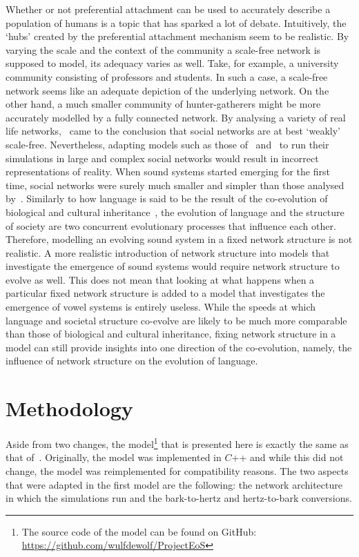 \documentclass[11pt]{article}
\begin{document}
Whether or not preferential attachment can be used to accurately describe a population of humans is a topic that has
sparked a lot of debate. Intuitively, the `hubs' created by the preferential attachment mechanism seem to be realistic.
By varying the scale and the context of the community a scale-free network is supposed to model, its adequacy varies as
well. Take, for example, a university community consisting of professors and students. In such a case, a scale-free
network seems like an adequate depiction of the underlying network. On the other hand, a much smaller community of
hunter-gatherers might be more accurately modelled by a fully connected network. By analysing a variety of real life
networks,~ came to the conclusion that social networks are at best `weakly'
scale-free. Nevertheless, adapting models such as those of~
and~ to run their simulations in large and complex social networks
would result in incorrect representations of reality. When sound systems started emerging for the first time, social
networks were surely much smaller and simpler than those analysed by~.
Similarly to how language is said to be the result of the co-evolution of biological and cultural
inheritance~, the evolution of language and the structure of
society are two concurrent evolutionary processes that influence each other. Therefore, modelling an evolving sound
system in a fixed network structure is not realistic. A more realistic introduction of network structure into models
that investigate the emergence of sound systems would require network structure to evolve as well. This does not mean
that looking at what happens when a particular fixed network structure is added to a model that investigates the
emergence of vowel systems is entirely useless. While the speeds at which language and societal structure co-evolve are
likely to be much more comparable than those of biological and cultural inheritance, fixing network structure in a
model can still provide insights into one direction of the co-evolution, namely, the influence of network structure on
the evolution of language.

\section{Methodology\label{sec:methods}}
Aside from two changes, the model\footnote{The source code of the model can be found on GitHub:
    \url{https://github.com/wulfdewolf/ProjectEoS}} that is presented here is exactly the same as that
of~. Originally, the model was implemented in $C$++ and while this did
not change, the model was reimplemented for compatibility reasons. The two aspects that were adapted in  the first
model are the following: the network architecture in which the simulations run and the bark-to-hertz and hertz-to-bark
conversions.
\end{document}
